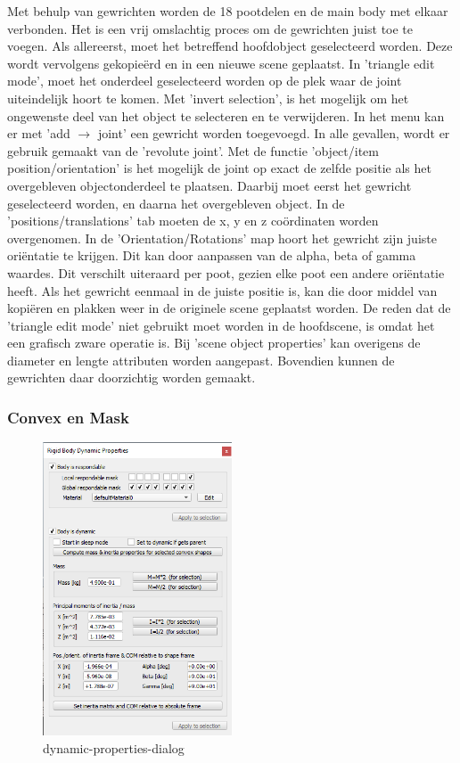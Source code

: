 \documentclass[10pt,a4paper]{article}
\begin{document}
 Met behulp van gewrichten worden de 18 pootdelen en de main body met elkaar verbonden. Het is een vrij omslachtig proces om de gewrichten juist toe te voegen. Als allereerst, moet het betreffend hoofdobject geselecteerd worden. Deze wordt vervolgens gekopie\"erd en in een nieuwe scene geplaatst. In 'triangle edit mode', moet het onderdeel geselecteerd worden op de plek waar de joint uiteindelijk hoort te komen. Met 'invert selection', is het mogelijk om het ongewenste deel van het object te selecteren en te verwijderen. In het menu kan er met 'add $\rightarrow$ joint' een gewricht worden toegevoegd. In alle gevallen, wordt er gebruik gemaakt van de 'revolute joint'. Met de functie 'object/item position/orientation' is het mogelijk de joint op exact de zelfde positie als het overgebleven objectonderdeel te plaatsen. Daarbij moet eerst het gewricht geselecteerd worden, en daarna het overgebleven object. In de 'positions/translations' tab moeten de x, y en z co\"ordinaten worden overgenomen. In de 'Orientation/Rotations' map hoort het gewricht zijn juiste ori\"entatie te krijgen. Dit kan door aanpassen van de alpha, beta of gamma waardes. Dit verschilt uiteraard per poot, gezien elke poot een andere ori\"entatie heeft. Als het gewricht eenmaal in de juiste positie is, kan die door middel van kopi\"eren en plakken weer in de originele scene geplaatst worden. De reden dat de 'triangle edit mode' niet gebruikt moet worden in de hoofdscene, is omdat het een grafisch zware operatie is. Bij 'scene object properties' kan overigens de diameter en lengte attributen worden aangepast. Bovendien kunnen de gewrichten daar doorzichtig worden gemaakt.

\subsubsection{Convex en Mask}
\begin{figure}[h]
    \centering
    \includegraphics[width=0.5\textwidth]{dynamic-properties-dialog}
    \caption{dynamic-properties-dialog}
    \label{fig:dynamic-properties-dialog}
\end{figure}
\end{document}
